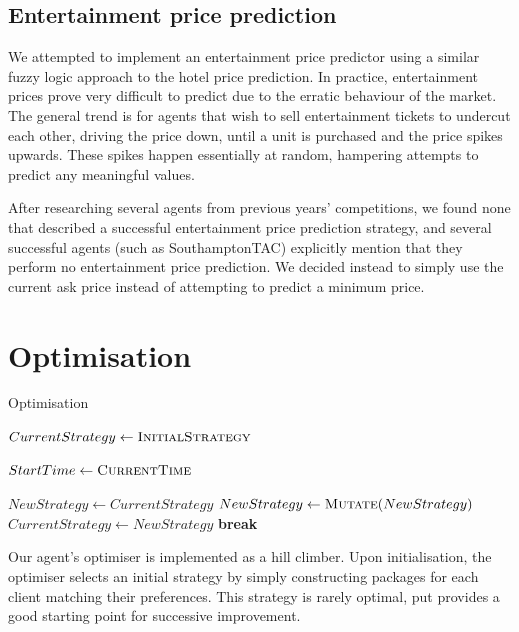 \documentclass[a4paper]{proc}
\newcommand{\Break}{\State \textbf{break}}
\begin{document}
\subsection{Entertainment price prediction}

We attempted to implement an entertainment price predictor using a similar fuzzy logic approach to the hotel price prediction. In practice, entertainment prices prove very difficult to predict due to the erratic behaviour of the market. The general trend is for agents that wish to sell entertainment tickets to undercut each other, driving the price down, until a unit is purchased and the price spikes upwards. These spikes happen essentially at random, hampering attempts to predict any meaningful values.

After researching several agents from previous years' competitions, we found none that described a successful entertainment price prediction strategy, and several successful agents (such as SouthamptonTAC) explicitly mention that they perform no entertainment price prediction. We decided instead to simply use the current ask price instead of attempting to predict a minimum price.

\section{Optimisation}

\begin{algorithm}
  \caption{Optimisation}
  \label{alg:optimisation}
  \begin{algorithmic}
    \small
    \State $CurrentStrategy \gets \Call{InitialStrategy}{}$

      \State $StartTime \gets \Call{CurrentTime}{}$

        \State $NewStrategy \gets CurrentStrategy$
          \State $NewStrategy \gets \Call{Mutate}{NewStrategy}$
            \State $CurrentStrategy \gets NewStrategy$
            \Break
          \EndIf
        \EndFor
      \EndWhile
      \State {}
    \EndFunction
  \end{algorithmic}
\end{algorithm}

Our agent's optimiser is implemented as a hill climber. Upon initialisation, the optimiser selects an initial strategy by simply constructing packages for each client matching their preferences. This strategy is rarely optimal, put provides a good starting point for successive improvement.
\end{document}

